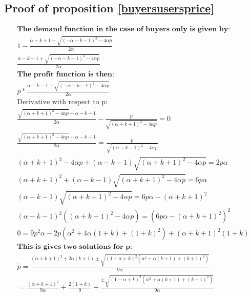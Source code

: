 \documentclass[12pt]{report}
\numberwithin{equation}{section}
\begin{document}
\subsection{Proof of proposition \ref{buyersusersprice}} \label{buyersuserspriceproof}

\begin{align*}
\textbf{The demand function in the case of buyers only is given by:} \\
1-\frac{\alpha+k+1-\sqrt{(-\alpha-k-1)^2-4 \alpha p}}{2 \alpha} \\
\frac{\alpha-k-1+\sqrt{(-\alpha-k-1)^2-4 \alpha p}}{2 \alpha}
\\
\textbf{The profit function is then:} 
\\
p*\frac{\alpha-k-1+\sqrt{(-\alpha-k-1)^2-4 \alpha p}}{2 \alpha}
\\
\text{Derivative with respect to p}: \\
\frac{\sqrt{(\alpha+k+1)^2-4 \alpha p}+\alpha-k-1}{2 \alpha}-\frac{p}{\sqrt{(\alpha+k+1)^2-4 \alpha p}} =0
\\
\frac{\sqrt{(\alpha+k+1)^2-4 \alpha p}+\alpha-k-1}{2 \alpha} =\frac{p}{\sqrt{(\alpha+k+1)^2-4 \alpha p}} \\
( \alpha+k+1)^2-4 \alpha p+(\alpha-k-1)\sqrt{(\alpha+k+1)^2-4 \alpha p} = 2 p \alpha \\
( \alpha+k+1)^2+(\alpha-k-1)\sqrt{(\alpha+k+1)^2-4 \alpha p} = 6 p \alpha \\
(\alpha-k-1)\sqrt{(\alpha+k+1)^2-4 \alpha p} = 6 p \alpha - ( \alpha+k+1)^2 \\
(\alpha-k-1)^2((\alpha+k+1)^2-4 \alpha p) = (6 p \alpha - ( \alpha+k+1)^2 )^2
\\
0 = 9 p^2 \alpha  -2 p (\alpha^2 + 4\alpha(1+k)+(1+k)^2) + ( \alpha+k+1)^2 (1+k)
\\
\textbf{This is gives two solutions for p:} \\
\tilde{p} = \frac{(\alpha+k+1)^2+2\alpha(k+1) \pm \sqrt{(1-\alpha+k)^2(\alpha^2+\alpha (k+1)+(k+1)^2)}}{9 \alpha} \\
 = \frac{(\alpha+k+1)^2}{9 \alpha}+\frac{2(1+k)}{9}+\frac{ \pm \sqrt{(1-\alpha+k)^2(\alpha^2+\alpha (k+1)+(k+1)^2)}}{9 \alpha} \\
\end{align*}
\end{document}
